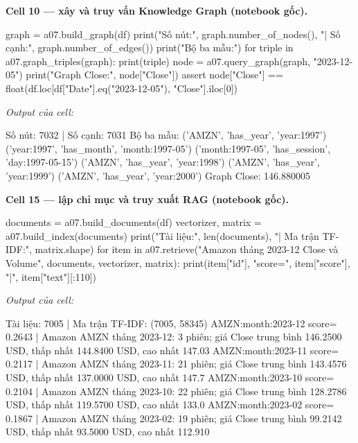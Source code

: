 \documentclass[12pt,a4paper]{report}
\begin{document}
\par\medskip\noindent\textbf{Cell 10 --- xây và truy vấn Knowledge Graph (notebook gốc).}
\begin{NotebookCode}
graph = a07.build_graph(df)
print("Số nút:", graph.number_of_nodes(), "| Số cạnh:", graph.number_of_edges())
print("Bộ ba mẫu:")
for triple in a07.graph_triples(graph): print(triple)
node = a07.query_graph(graph, "2023-12-05")
print("Graph Close:", node["Close"])
assert node["Close"] == float(df.loc[df["Date"].eq("2023-12-05"), "Close"].iloc[0])
\end{NotebookCode}
\noindent\textit{Output của cell:}
\begin{NotebookOutput}
Số nút: 7032 | Số cạnh: 7031
Bộ ba mẫu:
('AMZN', 'has_year', 'year:1997')
('year:1997', 'has_month', 'month:1997-05')
('month:1997-05', 'has_session', 'day:1997-05-15')
('AMZN', 'has_year', 'year:1998')
('AMZN', 'has_year', 'year:1999')
('AMZN', 'has_year', 'year:2000')
Graph Close: 146.880005
\end{NotebookOutput}

\par\medskip\noindent\textbf{Cell 15 --- lập chỉ mục và truy xuất RAG (notebook gốc).}
\begin{NotebookCode}
documents = a07.build_documents(df)
vectorizer, matrix = a07.build_index(documents)
print("Tài liệu:", len(documents), "| Ma trận TF-IDF:", matrix.shape)
for item in a07.retrieve("Amazon tháng 2023-12 Close và Volume", documents, vectorizer, matrix):
    print(item["id"], "score=", item["score"], "|", item["text"][:110])
\end{NotebookCode}
\noindent\textit{Output của cell:}
\begin{NotebookOutput}
Tài liệu: 7005 | Ma trận TF-IDF: (7005, 58345)
AMZN:month:2023-12 score= 0.2643 | Amazon AMZN tháng 2023-12: 3 phiên; giá Close trung bình 146.2500 USD, thấp nhất 144.8400 USD, cao nhất 147.03
AMZN:month:2023-11 score= 0.2117 | Amazon AMZN tháng 2023-11: 21 phiên; giá Close trung bình 143.4576 USD, thấp nhất 137.0000 USD, cao nhất 147.7
AMZN:month:2023-10 score= 0.2104 | Amazon AMZN tháng 2023-10: 22 phiên; giá Close trung bình 128.2786 USD, thấp nhất 119.5700 USD, cao nhất 133.0
AMZN:month:2023-02 score= 0.1867 | Amazon AMZN tháng 2023-02: 19 phiên; giá Close trung bình 99.2142 USD, thấp nhất 93.5000 USD, cao nhất 112.910
\end{NotebookOutput}
\end{document}
